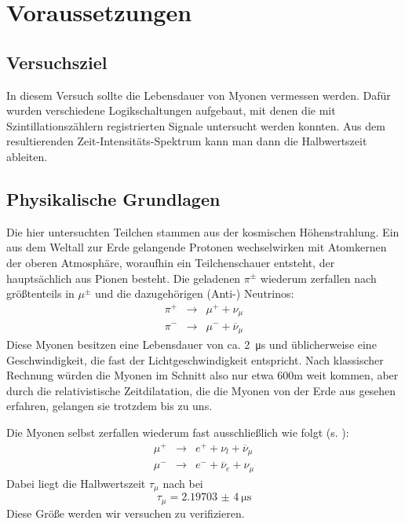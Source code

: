 \section{Voraussetzungen}

\subsection{Versuchsziel}

In diesem Versuch sollte die Lebensdauer von Myonen vermessen werden. Dafür
wurden verschiedene Logikschaltungen aufgebaut, mit denen die mit
Szintillationszählern registrierten Signale untersucht werden konnten. Aus dem
resultierenden Zeit-Intensitäts-Spektrum kann man dann die Halbwertszeit
ableiten.

\subsection{Physikalische Grundlagen}

Die hier untersuchten Teilchen stammen aus der kosmischen Höhenstrahlung. Ein
aus dem Weltall zur Erde gelangende Protonen wechselwirken mit Atomkernen der
oberen Atmosphäre, woraufhin ein Teilchenschauer entsteht, der hauptsächlich
aus Pionen besteht. Die geladenen $π^{\pm}$ wiederum zerfallen nach
\cite[Gl.16]{script} größtenteils in
$μ^{\pm}$ und die dazugehörigen (Anti-) Neutrinos:
\begin{eqnarray}
π^+ &\rightarrow& μ^+ + ν_μ\\
π^- &\rightarrow& μ^- + \overline{ν}_μ
\end{eqnarray}
Diese Myonen besitzen eine Lebensdauer von ca. \SI{2}{\micro\second} und
üblicherweise eine Geschwindigkeit, die fast der Lichtgeschwindigkeit
entspricht. Nach klassischer Rechnung würden die Myonen im Schnitt also nur
etwa 600m weit kommen, aber durch die relativistische Zeitdilatation, die die
Myonen von der Erde aus gesehen erfahren, gelangen sie trotzdem bis zu uns.

Die Myonen selbst zerfallen wiederum fast ausschließlich wie folgt (s.
\cite[Gl.5]{script}):
\begin{eqnarray}
μ^+ &\rightarrow& e^+ + ν_l + \overline{ν}_μ\\
μ^- &\rightarrow& e^- + \overline{ν}_e + ν_μ
\end{eqnarray}
Dabei liegt die Halbwertszeit $τ_μ$ nach \cite[Gl.4]{script} bei
\begin{equation}
τ_μ = \SI{2,19703(4)}{\micro\second} 
\end{equation}
Diese Größe werden wir versuchen zu verifizieren.

